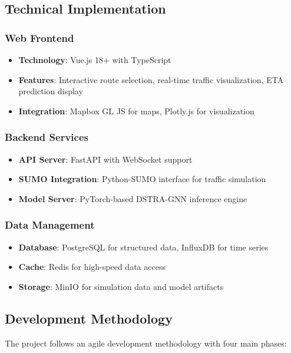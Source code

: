 \documentclass[12pt,a4paper]{article}
\begin{document}
\subsection{Technical Implementation}

\subsubsection{Web Frontend}
\begin{itemize}
    \item \textbf{Technology}: Vue.js 18+ with TypeScript
    \item \textbf{Features}: Interactive route selection, real-time traffic visualization, ETA prediction display
    \item \textbf{Integration}: Mapbox GL JS for maps, Plotly.js for visualization
\end{itemize}

\subsubsection{Backend Services}
\begin{itemize}
    \item \textbf{API Server}: FastAPI with WebSocket support
    \item \textbf{SUMO Integration}: Python-SUMO interface for traffic simulation
    \item \textbf{Model Server}: PyTorch-based DSTRA-GNN inference engine
\end{itemize}

\subsubsection{Data Management}
\begin{itemize}
    \item \textbf{Database}: PostgreSQL for structured data, InfluxDB for time series
    \item \textbf{Cache}: Redis for high-speed data access
    \item \textbf{Storage}: MinIO for simulation data and model artifacts
\end{itemize}

\subsection{Development Methodology}

The project follows an agile development methodology with four main phases:
\end{document}
